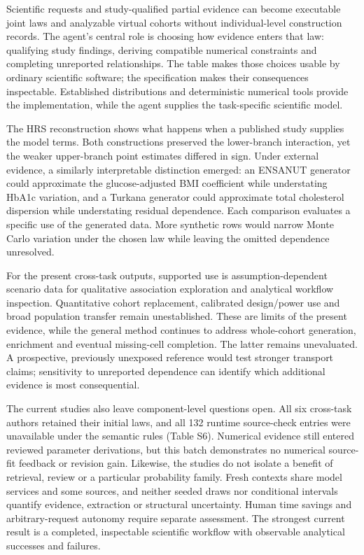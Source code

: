 \documentclass[sigconf,anonymous,review]{acmart}
\begin{document}
Scientific requests and study-qualified partial evidence can become executable joint laws and analyzable virtual cohorts without individual-level construction records. The agent's central role is choosing how evidence enters that law: qualifying study findings, deriving compatible numerical constraints and completing unreported relationships. The table makes those choices usable by ordinary scientific software; the specification makes their consequences inspectable. Established distributions and deterministic numerical tools provide the implementation, while the agent supplies the task-specific scientific model.


The HRS reconstruction shows what happens when a published study supplies the model terms. Both constructions preserved the lower-branch interaction, yet the weaker upper-branch point estimates differed in sign. Under external evidence, a similarly interpretable distinction emerged: an ENSANUT generator could approximate the glucose-adjusted BMI coefficient while understating HbA1c variation, and a Turkana generator could approximate total cholesterol dispersion while understating residual dependence. Each comparison evaluates a specific use of the generated data. More synthetic rows would narrow Monte Carlo variation under the chosen law while leaving the omitted dependence unresolved.


For the present cross-task outputs, supported use is assumption-dependent scenario data for qualitative association exploration and analytical workflow inspection. Quantitative cohort replacement, calibrated design/\allowbreak{}power use and broad population transfer remain unestablished. These are limits of the present evidence, while the general method continues to address whole-cohort generation, enrichment and eventual missing-cell completion. The latter remains unevaluated. A prospective, previously unexposed reference would test stronger transport claims; sensitivity to unreported dependence can identify which additional evidence is most consequential.


The current studies also leave component-level questions open. All six cross-task authors retained their initial laws, and all 132 runtime source-check entries were unavailable under the semantic rules (Table S6). Numerical evidence still entered reviewed parameter derivations, but this batch demonstrates no numerical source-fit feedback or revision gain. Likewise, the studies do not isolate a benefit of retrieval, review or a particular probability family. Fresh contexts share model services and some sources, and neither seeded draws nor conditional intervals quantify evidence, extraction or structural uncertainty. Human time savings and arbitrary-request autonomy require separate assessment. The strongest current result is a completed, inspectable scientific workflow with observable analytical successes and failures.
\end{document}
